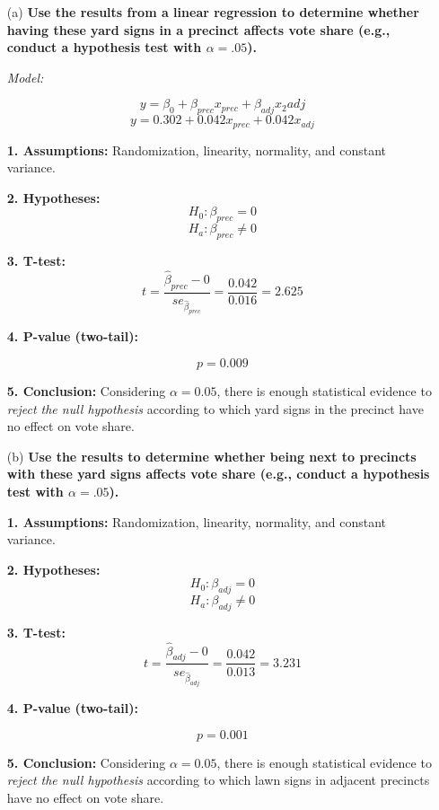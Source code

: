 \documentclass[12pt,letterpaper]{article}
\begin{document}
\begin{enumerate}
	\item [(a)]
	\textbf{Use the results from a linear regression to determine whether having these yard signs in a precinct affects vote share (e.g., conduct a hypothesis test with $\alpha = .05$).}
	
	\begin{center}
		\textit{Model:}
	\end{center}
	$$y = \beta_0 + \beta_{prec} x_{prec} + \beta_{adj} x_2
	{adj}$$
	$$y = 0.302 + 0.042 x_{prec} + 0.042 x_{adj}$$
	
	\newpage
	
	\textbf{1. Assumptions:} Randomization, linearity, normality, and constant variance.
	
	\textbf{2. Hypotheses:}
	$$H_0: \beta_{prec} = 0$$
	$$H_a: \beta_{prec} \neq 0$$
	
	\textbf{3. T-test:}
	$$t = \frac{\hat{\beta}_{prec} - 0}{se_{\hat{\beta}_{prec}}} = \frac{0.042}{0.016} = 2.625$$
	
	\textbf{4. P-value (two-tail):}
	
	$$p = 0.009$$
	
	\textbf{5. Conclusion:} Considering $\alpha = 0.05$, there is enough statistical evidence to \textit{reject the null hypothesis} according to which yard signs in the precinct have no effect on vote share.
	
	\item [(b)]
	\textbf{Use the results to determine whether being
	next to precincts with these yard signs affects vote
	share (e.g., conduct a hypothesis test with $\alpha = .05$).}
	
	\textbf{1. Assumptions:} Randomization, linearity, normality, and constant variance.
	
	\textbf{2. Hypotheses:}
	$$H_0: \beta_{adj} = 0$$
	$$H_a: \beta_{adj} \neq 0$$
	
	\textbf{3. T-test:}
	$$t = \frac{\hat{\beta}_{adj} - 0}{se_{\hat{\beta}_{adj}}} = \frac{0.042}{0.013} = 3.231$$
	
	\textbf{4. P-value (two-tail):}
	
	$$p = 0.001$$
	
	\textbf{5. Conclusion:} Considering $\alpha = 0.05$, there is enough statistical evidence to \textit{reject the null hypothesis} according to which lawn signs in adjacent precincts have no effect on vote share.
	

\end{enumerate}
\end{document}
